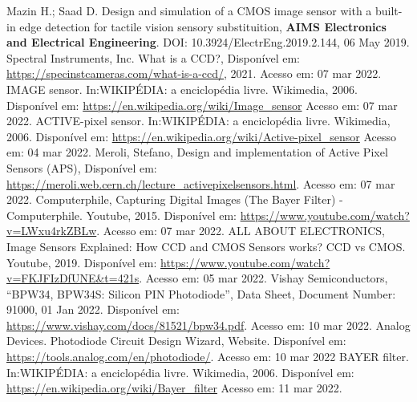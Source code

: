 \documentclass[10pt,a4paper,twocolumn]{article}
\begin{document}
	\begin{thebibliography}{99}
		{Mazin H.; Saad D. {Design and simulation of a CMOS image sensor with a built-in edge detection for tactile vision sensory substituition}, \textbf{AIMS Electronics and Electrical Engineering}. DOI: 10.3924/ElectrEng.2019.2.144, 06 May 2019.}
		{Spectral Instruments, Inc. {What is a CCD?}, Disponível em: \url{https://specinstcameras.com/what-is-a-ccd/}, 2021. Acesso em: 07 mar 2022.}
		{IMAGE sensor. In:WIKIPÉDIA: a enciclopédia livre. Wikimedia, 2006. Disponível em: \url{https://en.wikipedia.org/wiki/Image_sensor} Acesso em: 07 mar 2022.}
		{ACTIVE-pixel sensor. In:WIKIPÉDIA: a enciclopédia livre. Wikimedia, 2006. Disponível em: \url{https://en.wikipedia.org/wiki/Active-pixel_sensor} Acesso em: 04 mar 2022.}
		{Meroli, Stefano, {Design and implementation of Active Pixel Sensors (APS)}, Disponível em: \url{https://meroli.web.cern.ch/lecture_activepixelsensors.html}. Acesso em: 07 mar 2022.}
		{Computerphile, {Capturing Digital Images (The Bayer Filter) - Computerphile}. Youtube, 2015. Disponível em: \url{https://www.youtube.com/watch?v=LWxu4rkZBLw}. Acesso em: 07 mar 2022.}
		{ALL ABOUT ELECTRONICS, {Image Sensors Explained: How CCD and CMOS Sensors works? CCD vs CMOS}. Youtube, 2019. Disponível em: \url{https://www.youtube.com/watch?v=FKJFIzDfUNE&t=421s}. Acesso em: 05 mar 2022.}
		{Vishay Semiconductors, {``BPW34, BPW34S: Silicon PIN Photodiode''}, Data Sheet, Document Number: 91000, 01 Jan 2022. Disponível em: \url{https://www.vishay.com/docs/81521/bpw34.pdf}. Acesso em: 10 mar 2022.}
		{Analog Devices. {Photodiode Circuit Design Wizard}, Website. Disponível em: \url{https://tools.analog.com/en/photodiode/}. Acesso em: 10 mar 2022}
		{BAYER filter. In:WIKIPÉDIA: a enciclopédia livre. Wikimedia, 2006. Disponível em: \url{https://en.wikipedia.org/wiki/Bayer_filter} Acesso em: 11 mar 2022.}

	\end{thebibliography}
\end{document}

